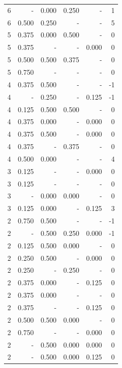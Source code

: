 \documentclass[a4paper]{article}\usepackage[]{graphicx}\usepackage[]{color}
\begin{document}
\begin{table}[ht]
\begin{tabular}{rrrrrr}
   \rowcolor{badColor} 6 & - & 0.000 & 0.250 & - & 1 \\ 
  6 & 0.500 & 0.250 & - & - & 5 \\ 
   \rowcolor{badColor} 5 & 0.375 & 0.000 & 0.500 & - & 0 \\ 
   \rowcolor{nullColor} 5 & 0.375 & - & - & 0.000 & 0 \\ 
  5 & 0.500 & 0.500 & 0.375 & - & 0 \\ 
   \rowcolor{nullColor} 5 & 0.750 & - & - & - & 0 \\ 
  4 & 0.375 & 0.500 & - & - & -1 \\ 
  4 & - & 0.250 & - & 0.125 & -1 \\ 
   \rowcolor{goodColor} 4 & 0.125 & 0.500 & 0.500 & - & 0 \\ 
  4 & 0.375 & 0.000 & - & 0.000 & 0 \\ 
  4 & 0.375 & 0.500 & - & 0.000 & 0 \\ 
   \rowcolor{sosoColor} 4 & 0.375 & - & 0.375 & - & 0 \\ 
  4 & 0.500 & 0.000 & - & - & 4 \\ 
   \rowcolor{nullColor} 3 & 0.125 & - & - & 0.000 & 0 \\ 
   \rowcolor{nullColor} 3 & 0.125 & - & - & - & 0 \\ 
   \rowcolor{goodColor} 3 & - & 0.000 & 0.000 & - & 0 \\ 
  3 & 0.125 & 0.000 & - & 0.125 & 3 \\ 
  2 & 0.750 & 0.500 & - & - & -1 \\ 
   \rowcolor{badColor} 2 & - & 0.500 & 0.250 & 0.000 & -1 \\ 
   \rowcolor{badColor} 2 & 0.125 & 0.500 & 0.000 & - & 0 \\ 
  2 & 0.250 & 0.500 & - & 0.000 & 0 \\ 
   \rowcolor{sosoColor} 2 & 0.250 & - & 0.250 & - & 0 \\ 
  2 & 0.375 & 0.000 & - & 0.125 & 0 \\ 
  2 & 0.375 & 0.000 & - & - & 0 \\ 
   \rowcolor{nullColor} 2 & 0.375 & - & - & 0.125 & 0 \\ 
   \rowcolor{badColor} 2 & 0.500 & 0.500 & 0.000 & - & 0 \\ 
   \rowcolor{nullColor} 2 & 0.750 & - & - & 0.000 & 0 \\ 
   \rowcolor{badColor} 2 & - & 0.500 & 0.000 & 0.000 & 0 \\ 
   \rowcolor{badColor} 2 & - & 0.500 & 0.000 & 0.125 & 0 \\ 

\end{tabular}
\end{table}
\end{document}
